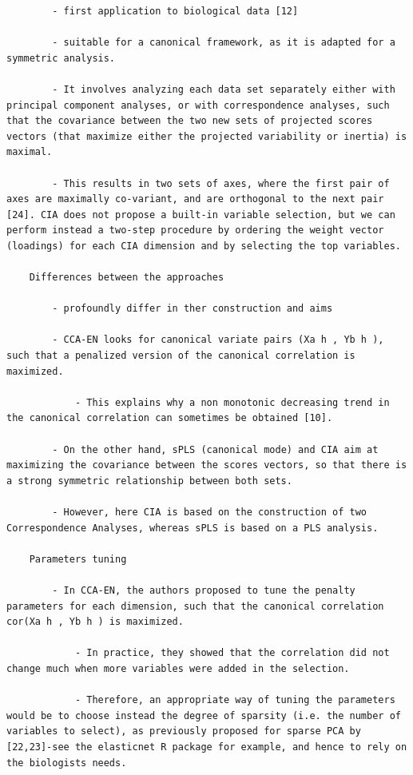 \documentclass[
]{book}
\begin{document}
\begin{verbatim}
        - first application to biological data [12]

        - suitable for a canonical framework, as it is adapted for a symmetric analysis.

        - It involves analyzing each data set separately either with principal component analyses, or with correspondence analyses, such that the covariance between the two new sets of projected scores vectors (that maximize either the projected variability or inertia) is maximal.

        - This results in two sets of axes, where the first pair of axes are maximally co-variant, and are orthogonal to the next pair [24]. CIA does not propose a built-in variable selection, but we can perform instead a two-step procedure by ordering the weight vector (loadings) for each CIA dimension and by selecting the top variables.

    Differences between the approaches

        - profoundly differ in ther construction and aims

        - CCA-EN looks for canonical variate pairs (Xa h , Yb h ), such that a penalized version of the canonical correlation is maximized.

            - This explains why a non monotonic decreasing trend in the canonical correlation can sometimes be obtained [10].

        - On the other hand, sPLS (canonical mode) and CIA aim at maximizing the covariance between the scores vectors, so that there is a strong symmetric relationship between both sets.

        - However, here CIA is based on the construction of two Correspondence Analyses, whereas sPLS is based on a PLS analysis.

    Parameters tuning

        - In CCA-EN, the authors proposed to tune the penalty parameters for each dimension, such that the canonical correlation cor(Xa h , Yb h ) is maximized.

            - In practice, they showed that the correlation did not change much when more variables were added in the selection.

            - Therefore, an appropriate way of tuning the parameters would be to choose instead the degree of sparsity (i.e. the number of variables to select), as previously proposed for sparse PCA by [22,23]-see the elasticnet R package for example, and hence to rely on the biologists needs.


\end{verbatim}
\end{document}
